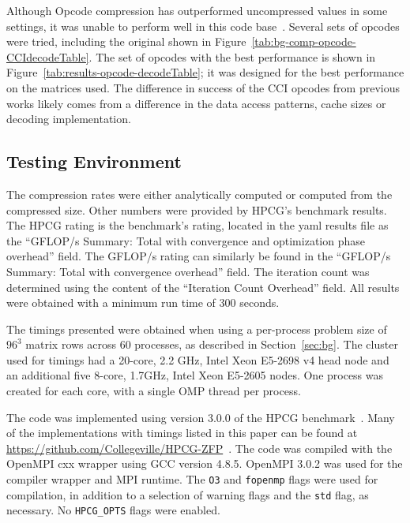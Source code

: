 Although Opcode compression has outperformed uncompressed values in some settings, it was unable to perform well in this code base~\cite{Lawlor:2013:compression}.
Several sets of opcodes were tried, including the original shown in Figure~\ref{tab:bg-comp-opcode-CCIdecodeTable}.
The set of opcodes with the best performance is shown in Figure~\ref{tab:results-opcode-decodeTable}; it was designed for the best performance on the matrices used.
The difference in success of the CCI opcodes from previous works likely comes from a difference in the data access patterns, cache sizes or decoding implementation.

\subsection{Testing Environment}
The compression rates were either analytically computed or computed from the compressed size.
Other numbers were provided by HPCG's benchmark results.
The HPCG rating is the benchmark's rating, located in the yaml results file as the ``GFLOP/s Summary: Total with convergence and optimization phase overhead'' field.
The GFLOP/s rating can similarly be found in the ``GFLOP/s Summary: Total with convergence overhead'' field.
The iteration count was determined using the content of the ``Iteration Count Overhead'' field.
All results were obtained with a minimum run time of 300 seconds.

The timings presented were obtained when using a per-process problem size of \(96^3\) matrix rows across 60 processes, as described in Section~\ref{sec:bg}.
The cluster used for timings had a 20-core, 2.2 GHz, Intel Xeon E5-2698 v4 head node and an additional five 8-core, 1.7GHz, Intel Xeon E5-2605 nodes.
One process was created for each core, with a single OMP thread per process.

The code was implemented using version 3.0.0 of the HPCG benchmark~\cite{Dongarra:2015:HPCG}.
Many of the implementations with timings listed in this paper can be found at \url{https://github.com/Collegeville/HPCG-ZFP}~\cite{Lindquist:2018:projectGithub}.
The code was compiled with the OpenMPI cxx wrapper using GCC version 4.8.5.
OpenMPI 3.0.2 was used for the compiler wrapper and MPI runtime.
The \texttt{O3} and \texttt{fopenmp} flags were used for compilation, in addition to a selection of warning flags and the \texttt{std} flag, as necessary.
No \texttt{HPCG\_OPTS} flags were enabled.